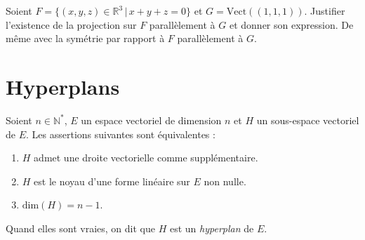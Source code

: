 \documentclass[a4paper,10pt]{report}
\begin{document}
\begin{exa} Soient $F= \lbrace (x,y,z) \in \mathbb{R}^3 \, \vert \, x+y+z =0 \rbrace$ et $G= \textrm{Vect}((1,1,1))$. Justifier l'existence de la projection sur $F$ parallèlement à $G$ et donner son expression. De même avec la symétrie par rapport à $F$ parallèlement à $G$. \end{exa}

\section{Hyperplans}

\begin{thm} Soient $n \in \mathbb{N}^*$, $E$ un espace vectoriel de dimension $n$ et $H$ un sous-espace vectoriel de $E$. Les assertions suivantes sont équivalentes :

\begin{enumerate}
\item $H$ admet une droite vectorielle comme supplémentaire.
\item $H$ est le noyau d'une forme linéaire sur $E$ non nulle.
\item $\textrm{dim}(H)=n-1$.
\end{enumerate}
Quand elles sont vraies, on dit que $H$ est un \textit{hyperplan} de $E$.
\end{thm}
\end{document}
